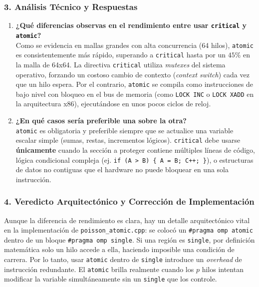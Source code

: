 \documentclass[11pt,a4paper]{article}
\begin{document}
\subsubsection*{3. Análisis Técnico y Respuestas}

\begin{enumerate}
    \item \textbf{¿Qué diferencias observas en el rendimiento entre usar \texttt{critical} y \texttt{atomic}?} \\
    Como se evidencia en mallas grandes con alta concurrencia (64 hilos), \texttt{atomic} es consistentemente más rápido, superando a \texttt{critical} hasta por un $45\%$ en la malla de 64x64. La directiva \texttt{critical} utiliza \textit{mutexes} del sistema operativo, forzando un costoso cambio de contexto (\textit{context switch}) cada vez que un hilo espera. Por el contrario, \texttt{atomic} se compila como instrucciones de bajo nivel con bloqueo en el bus de memoria (como \texttt{LOCK INC} o \texttt{LOCK XADD} en la arquitectura x86), ejecutándose en unos pocos ciclos de reloj.

    \item \textbf{¿En qué casos sería preferible una sobre la otra?} \\
    \texttt{atomic} es obligatoria y preferible siempre que se actualice una variable escalar simple (sumas, restas, incrementos lógicos). \texttt{critical} debe usarse \textbf{únicamente} cuando la sección a proteger contiene múltiples líneas de código, lógica condicional compleja (ej. \texttt{if (A > B) \{ A = B; C++; \}}), o estructuras de datos no contiguas que el hardware no puede bloquear en una sola instrucción.
\end{enumerate}

\subsubsection*{4. Veredicto Arquitectónico y Corrección de Implementación}
Aunque la diferencia de rendimiento es clara, hay un detalle arquitectónico vital en la implementación de \texttt{poisson\_atomic.cpp}: se colocó un \texttt{\#pragma omp atomic} dentro de un bloque \texttt{\#pragma omp single}. Si una región es \texttt{single}, por definición matemática solo un hilo accede a ella, haciendo imposible una condición de carrera. Por lo tanto, usar \texttt{atomic} dentro de \texttt{single} introduce un \textit{overhead} de instrucción redundante. El \texttt{atomic} brilla realmente cuando los $p$ hilos intentan modificar la variable simultáneamente sin un \texttt{single} que los controle.
\end{document}

